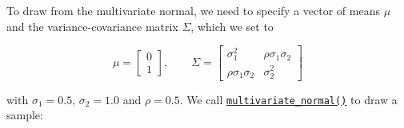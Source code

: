 \documentclass{scrartcl}
\begin{document}
    To draw from the multivariate normal, we need to specify a vector of
means \(\mu\) and the variance-covariance matrix \(\Sigma\), which we
set to

\[
\mu = \begin{bmatrix} 0 \\ 1\end{bmatrix}, \qquad 
\Sigma=\begin{bmatrix} \sigma_1^2 & \rho \sigma_1\sigma_2 \\ \rho\sigma_1\sigma_2 & \sigma_2^2\end{bmatrix}
\]

with \(\sigma_1 = 0.5\), \(\sigma_2 = 1.0\) and \(\rho = 0.5\). We call
\href{https://numpy.org/doc/stable/reference/random/generated/numpy.random.Generator.multivariate_normal.html}{\texttt{multivariate\_normal()}}
to draw a sample:
\end{document}
